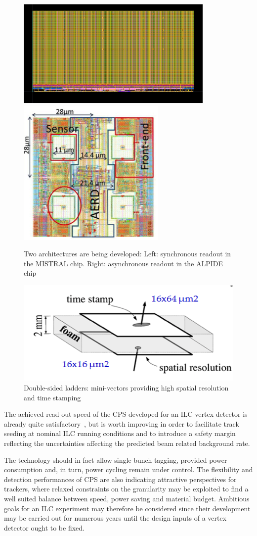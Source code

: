 \begin{figure}
	\centering
	\includegraphics[width=.45\linewidth]{VertexDetector/CMOS/Mistral}
	\includegraphics[width=.35\linewidth]{VertexDetector/CMOS/ALPIDE}
	\caption{Two architectures are being developed: Left: synchronous readout in the MISTRAL chip. Right: asynchronous readout in the ALPIDE chip}
	\label{fig:VertexDetector:CMOS:architectures}
\end{figure}

\begin{figure}
	\centering
	\includegraphics[width=.5\linewidth]{VertexDetector/CMOS/doubleSided}
	\caption{Double-sided ladders: mini-vectors providing
      high spatial resolution and time stamping}
	\label{fig:VertexDetector:CMOS:doubleSided}
\end{figure}

The achieved read-out speed of the CPS developed for an ILC
vertex detector is already quite satisfactory~\cite{Behnke:2013lya},
but is worth
improving in order to facilitate track seeding at nominal ILC
running conditions and to introduce a safety margin reflecting the
uncertainties affecting the predicted beam related background rate.

The technology should in fact allow single bunch tagging, provided power
consumption and, in turn, power cycling remain under control. The flexibility and detection performances of CPS are also indicating attractive perspectives for trackers, where relaxed constraints on the granularity may be exploited
to find a well suited balance between speed, power saving and material budget. Ambitious goals for an ILC experiment may therefore be considered
since their development may be carried out for numerous years until the design
inputs of a vertex detector ought to be fixed.

